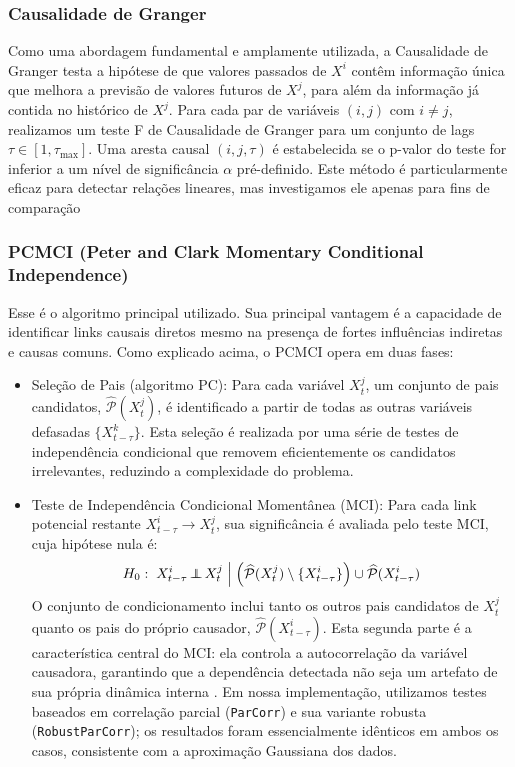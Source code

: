 \documentclass[12pt, a4paper]{article}
\newcommand{\indep}{\perp\kern-0.9em\perp}
\begin{document}
\subsubsection{Causalidade de Granger}
Como uma abordagem fundamental e amplamente utilizada, a Causalidade de Granger testa a hipótese de que valores passados de $X^i$ contêm informação única que melhora a previsão de valores futuros de $X^j$, para além da informação já contida no histórico de $X^j$. Para cada par de variáveis $(i, j)$ com $i \neq j$, realizamos um teste F de Causalidade de Granger para um conjunto de lags $\tau \in [1, \tau_{\max}]$. Uma aresta causal $(i, j, \tau)$ é estabelecida se o p-valor do teste for inferior a um nível de significância $\alpha$ pré-definido. Este método é particularmente eficaz para detectar relações lineares, mas investigamos ele apenas para fins de comparação

\subsubsection{PCMCI (Peter and Clark Momentary Conditional Independence)}
Esse é o algoritmo principal utilizado. Sua principal vantagem é a capacidade de identificar links causais diretos mesmo na presença de fortes influências indiretas e causas comuns. Como explicado acima, o PCMCI opera em duas fases:
\begin{itemize}
    \item Seleção de Pais (algoritmo PC): Para cada variável $X^j_t$, um conjunto de pais candidatos, $\widehat{\mathcal{P}}(X^j_t)$, é identificado a partir de todas as outras variáveis defasadas $\{X^k_{t-\tau}\}$. Esta seleção é realizada por uma série de testes de independência condicional que removem eficientemente os candidatos irrelevantes, reduzindo a complexidade do problema.
    \item Teste de Independência Condicional Momentânea (MCI): Para cada link potencial restante $X^i_{t-\tau} \rightarrow X^j_t$, sua significância é avaliada pelo teste MCI, cuja hipótese nula é:
    $$
    H_0:\; X^i_{t-\tau} \indep X^j_t \;\Big|\; \Bigl(\widehat{\mathcal{P}}(X^j_t) \setminus \{X^i_{t-\tau}\}\Bigr) \cup \widehat{\mathcal{P}}(X^i_{t-\tau})
    $$
    O conjunto de condicionamento inclui tanto os outros pais candidatos de $X^j_t$ quanto os pais do próprio causador, $\widehat{\mathcal{P}}(X^i_{t-\tau})$. Esta segunda parte é a característica central do MCI: ela controla a autocorrelação da variável causadora, garantindo que a dependência detectada não seja um artefato de sua própria dinâmica interna \cite{runge2018}. Em nossa implementação, utilizamos testes baseados em correlação parcial (\texttt{ParCorr}) e sua variante robusta (\texttt{RobustParCorr}); os resultados foram essencialmente idênticos em ambos os casos, consistente com a aproximação Gaussiana dos dados. 
\end{itemize}
\end{document}
